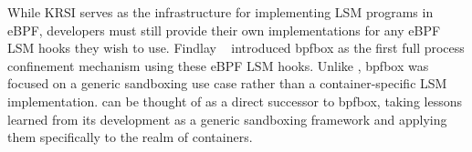 While KRSI serves as the infrastructure for implementing LSM programs in eBPF, developers must still provide their own implementations for any eBPF LSM hooks they wish to use. Findlay \etal~\cite{findlay2020_bpfbox} introduced bpfbox as the first full process confinement mechanism using these eBPF LSM hooks. Unlike \bpfcontain{}, bpfbox was focused on a generic sandboxing use case rather than a container-specific LSM implementation. \bpfcontain{} can be thought of as a direct successor to bpfbox, taking lessons learned from its development as a generic sandboxing framework and applying them specifically to the realm of containers.
